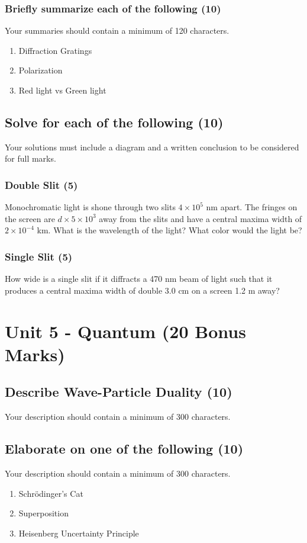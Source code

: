 \documentclass{article}
\begin{document}
\subsubsection{Briefly summarize each of the following (10)}
Your summaries should contain a minimum of 120 characters.
\begin{enumerate}[label=\alph*)]
    \item Diffraction Gratings
    \item Polarization
    \item Red light vs Green light
\end{enumerate}\leavevmode

\subsection{Solve for each of the following (10)}
Your solutions must include a diagram and a written conclusion to be considered for full marks.

\subsubsection{Double Slit (5)}
Monochromatic light is shone through two slits $4 \times 10^5$ nm apart. The fringes on the screen are $d \times 5 \times 10^3$ away from the slits and have a central maxima width of $2 \times 10^{-4}$ km. What is the wavelength of the light? What color would the light be?

\subsubsection{Single Slit (5)}
How wide is a single slit if it diffracts a 470 nm beam of light such that it produces a central maxima width of double 3.0 cm on a screen 1.2 m away?\\

\section{Unit 5 - Quantum (20 Bonus Marks)}
\subsection{Describe Wave-Particle Duality (10)}
Your description should contain a minimum of 300 characters.

\subsection{Elaborate on one of the following (10)}
Your description should contain a minimum of 300 characters.
\begin{enumerate}[label=\alph*)]
    \item Schrödinger's Cat
    \item Superposition
    \item Heisenberg Uncertainty Principle
\end{enumerate}\leavevmode\\
\end{document}
